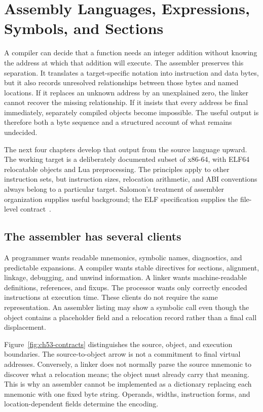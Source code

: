 \chapter{Assembly Languages, Expressions, Symbols, and Sections}
\label{ch:assembly-language}

A compiler can decide that a function needs an integer addition without knowing the address at which that addition will execute.
The assembler preserves this separation.
It translates a target-specific notation into instruction and data bytes, but it also records unresolved relationships between those bytes and named locations.
If it replaces an unknown address by an unexplained zero, the linker cannot recover the missing relationship.
If it insists that every address be final immediately, separately compiled objects become impossible.
The useful output is therefore both a byte sequence and a structured account of what remains undecided.

The next four chapters develop that output from the source language upward.
The working target is a deliberately documented subset of x86-64, with ELF64 relocatable objects and Lua preprocessing.
The principles apply to other instruction sets, but instruction sizes, relocation arithmetic, and ABI conventions always belong to a particular target.
Salomon's treatment of assembler organization supplies useful background; the ELF specification supplies the file-level contract~\cite{salomon-1993-assemblers,xinuos-2026-elf}.

\section{The assembler has several clients}
\label{sec:ch53-clients}

A programmer wants readable mnemonics, symbolic names, diagnostics, and predictable expansions.
A compiler wants stable directives for sections, alignment, linkage, debugging, and unwind information.
A linker wants machine-readable definitions, references, and fixups.
The processor wants only correctly encoded instructions at execution time.
These clients do not require the same representation.
An assembler listing may show a symbolic call even though the object contains a placeholder field and a relocation record rather than a final call displacement.

Figure~\ref{fig:ch53-contracts} distinguishes the source, object, and execution boundaries.
The source-to-object arrow is not a commitment to final virtual addresses.
Conversely, a linker does not normally parse the source mnemonic to discover what a relocation means; the object must already carry that meaning.
This is why an assembler cannot be implemented as a dictionary replacing each mnemonic with one fixed byte string.
Operands, widths, instruction forms, and location-dependent fields determine the encoding.

